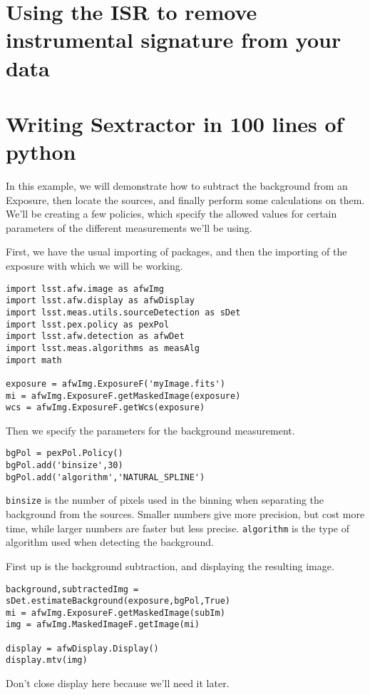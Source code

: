 
\section{Using the ISR to remove instrumental signature from your data}

\section{Writing Sextractor in 100 lines of python}


In this example, we will demonstrate how to subtract the background from an Exposure, then locate the sources, and finally perform some calculations on them.  We'll be creating a few policies, which specify the allowed values for certain parameters of the different measurements we'll be using.

First, we have the usual importing of packages, and then the importing of the exposure with which we will be working.

\begin{verbatim}
import lsst.afw.image as afwImg
import lsst.afw.display as afwDisplay
import lsst.meas.utils.sourceDetection as sDet
import lsst.pex.policy as pexPol
import lsst.afw.detection as afwDet
import lsst.meas.algorithms as measAlg
import math

exposure = afwImg.ExposureF('myImage.fits')
mi = afwImg.ExposureF.getMaskedImage(exposure)
wcs = afwImg.ExposureF.getWcs(exposure)
\end{verbatim}

Then we specify the parameters for the background measurement.
\begin{verbatim}
bgPol = pexPol.Policy()
bgPol.add('binsize',30)
bgPol.add('algorithm','NATURAL_SPLINE')
\end{verbatim}

\texttt{binsize} is the number of pixels used in the binning when separating the background from the sources.  Smaller numbers give more precision, but cost more time, while larger numbers are faster but less precise.  \texttt{algorithm} is the  type of algorithm used when detecting the background.

First up is the background subtraction, and displaying the resulting image.
\begin{verbatim}
background,subtractedImg = sDet.estimateBackground(exposure,bgPol,True)
mi = afwImg.ExposureF.getMaskedImage(subIm)
img = afwImg.MaskedImageF.getImage(mi)

display = afwDisplay.Display()
display.mtv(img)
\end{verbatim}
Don't close display here because we'll need it later.

